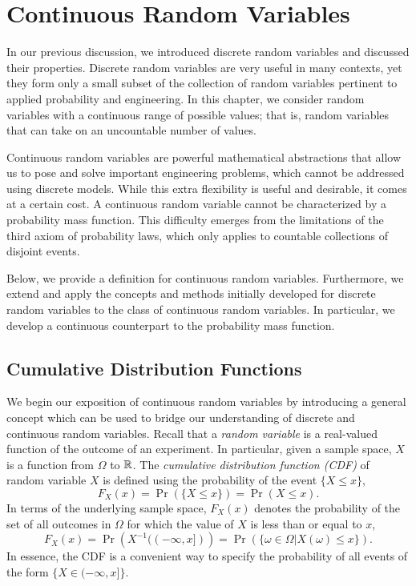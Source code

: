 \chapter{Continuous Random Variables}

In our previous discussion, we introduced discrete random variables and discussed their properties.
Discrete random variables are very useful in many contexts, yet they form only a small subset of the collection of random variables pertinent to applied probability and engineering.
In this chapter, we consider random variables with a continuous range of possible values; that is, random variables that can take on an uncountable number of values.

Continuous random variables are powerful mathematical abstractions that allow us to pose and solve important engineering problems, which cannot be addressed using discrete models.
While this extra flexibility is useful and desirable, it comes at a certain cost.
A continuous random variable cannot be characterized by a probability mass function.
This difficulty emerges from the limitations of the third axiom of probability laws, which only applies to countable collections of disjoint events.

Below, we provide a definition for continuous random variables.
Furthermore, we extend and apply the concepts and methods initially developed for discrete random variables to the class of continuous random variables.
In particular, we develop a continuous counterpart to the probability mass function.


\section{Cumulative Distribution Functions}

We begin our exposition of continuous random variables by introducing a general concept which can be used to bridge our understanding of discrete and continuous random variables.
Recall that a \emph{random variable} is a real-valued function of the outcome of an experiment. 
In particular, given a sample space, $X$ is a function from $\Omega$ to $\mathbb{R}$.
The \emph{cumulative distribution function (CDF)} of random variable $X$ is defined using the probability of the event $\{X \leq x \}$, 
\begin{equation*}
F_X (x) = \Pr ( \{ X \leq x \} ) = \Pr (X \leq x).
\end{equation*}
In terms of the underlying sample space, $F_X (x)$ denotes the probability of the set of all outcomes in $\Omega$ for which the value of $X$ is less than or equal to $x$,
\begin{equation*}
F_X (x) = \Pr \left( X^{-1} ( (- \infty, x]) \right)
= \Pr (\{ \omega \in \Omega | X(\omega) \leq x \}).
\end{equation*}
In essence, the CDF is a convenient way to specify the probability of all events of the form $\{ X \in (-\infty, x] \}$.

